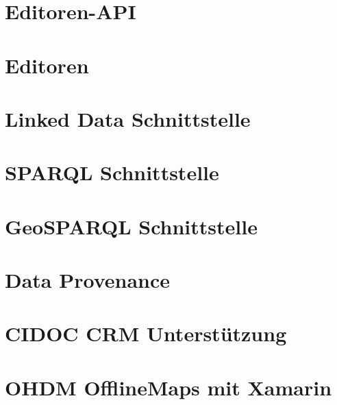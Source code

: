 \documentclass[german]{book}
\begin{document}
\chapter{Editoren-API}


\chapter{Editoren}


\chapter{Linked Data Schnittstelle}


\chapter{SPARQL Schnittstelle}


\chapter{GeoSPARQL Schnittstelle}


\chapter{Data Provenance}


\chapter{CIDOC CRM Unterstützung}


\chapter{OHDM OfflineMaps mit Xamarin}

\end{document}
